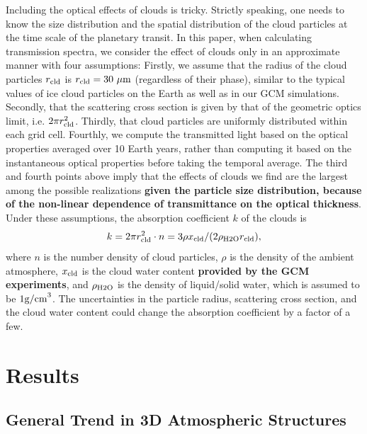 \documentclass[11pt,numberedappendix,twocolappendix,]{emulateapj}
\def\revise#1{{\bf #1}}
\begin{document}
Including the optical effects of clouds is tricky. 
Strictly speaking, one needs to know the size distribution and the spatial distribution of the cloud particles at the time scale of the planetary transit. 
In this paper, when calculating transmission spectra, we consider the effect of clouds only in an approximate manner with four assumptions:
%
Firstly, we assume that the radius of the cloud particles $r_{\rm cld}$ is $r_{\rm cld}=30~\mu {\rm m}$ (regardless of their phase), similar to the typical values of ice cloud particles on the Earth as well as in our GCM simulations.  
%
Secondly, that the scattering cross section is given by that of the geometric optics limit, i.e. $2 \pi r_{\rm cld}^2$. 
%
Thirdly, that cloud particles are uniformly distributed within each grid cell. 
%
Fourthly, we compute the transmitted light based on the optical properties averaged over 10 Earth years, rather than computing it based on the instantaneous optical properties before taking the temporal average. 
%
The third and fourth points above imply that the effects of clouds we find are the largest among the possible realizations \revise{given the particle size distribution, because of the non-linear dependence of transmittance on the optical thickness}. 
%
Under these assumptions, the absorption coefficient $k$ of the clouds is %
\begin{equation}
k = 2 \pi r_{\rm cld}^2 \cdot n = 3 \rho x_{\rm cld} / ( 2 \rho_{\rm H2O} r_{\rm cld} ),
\end{equation}
where $n$ is the number density of cloud particles, $\rho $ is the density of the ambient atmosphere, $x_{\rm cld}$ is the cloud water content \revise{provided by the GCM experiments}, and $\rho_{\rm H2O}$ is the density of liquid/solid water, which is assumed to be $1 {\rm g/cm}^3$. 
The uncertainties in the particle radius, scattering cross section, and the cloud water content could change the absorption coefficient by a factor of a few. 



\section{Results}
\label{s:results}

\subsection{General Trend in 3D Atmospheric Structures}
\label{ss:result_H2Omixingratio}
\end{document}
